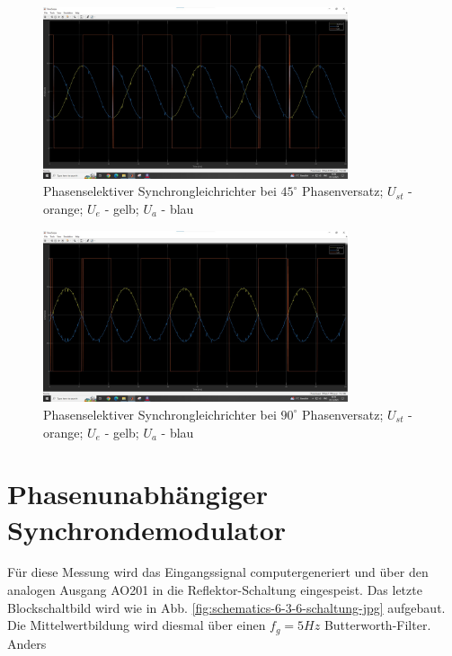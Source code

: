 \documentclass[a4paper]{article}
\begin{document}
\begin{figure}[h]
    \centering
    \includegraphics[width=0.8\textwidth]{images/6.3.5)gleichrichter_45gradv2.jpg}
    \caption{Phasenselektiver Synchrongleichrichter bei $45^\circ$ Phasenversatz;
    $U_{st}$ - orange; $U_{e}$ - gelb; $U_{a}$ - blau}
    \label{fig:images-6-3-5-gleichrichter_45gradv2-jpg}
\end{figure}

\begin{figure}[h]
    \centering
    \includegraphics[width=0.8\textwidth]{images/6.3.5)gleichrichter_90gradv2.jpg}
    \caption{Phasenselektiver Synchrongleichrichter bei $90^\circ$ Phasenversatz;
    $U_{st}$ - orange; $U_{e}$ - gelb; $U_{a}$ - blau}
    \label{fig:images-6-3-5-gleichrichter_90gradv2-jpg}
\end{figure}

\section{Phasenunabhängiger Synchrondemodulator}
Für diese Messung wird das Eingangssignal computergeneriert und über den analogen Ausgang
AO201 in die Reflektor-Schaltung eingespeist. Das letzte Blockschaltbild wird wie
in Abb. \ref{fig:schematics-6-3-6-schaltung-jpg} aufgebaut. Die Mittelwertbildung
wird diesmal über einen $f_{g}=5\unit{Hz}$ Butterworth-Filter. Anders 
\end{document}
